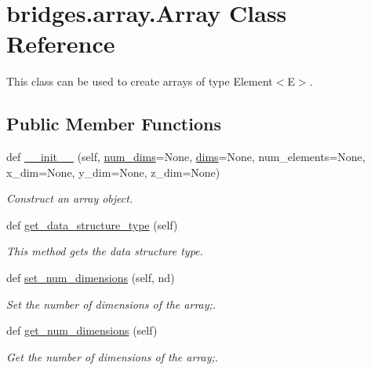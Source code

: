 \hypertarget{classbridges_1_1array_1_1_array}{}\section{bridges.\+array.\+Array Class Reference}
\label{classbridges_1_1array_1_1_array}


This class can be used to create arrays of type Element$<$\+E$>$.  


\subsection*{Public Member Functions}
\begin{DoxyCompactItemize}
\item 
def \mbox{\hyperlink{classbridges_1_1array_1_1_array_a72ca451990833d3a58c7eee6811009ad}{\+\_\+\+\_\+init\+\_\+\+\_\+}} (self, \mbox{\hyperlink{classbridges_1_1array_1_1_array_a2c28c3658312289dc2ae78f4099d4c76}{num\+\_\+dims}}=None, \mbox{\hyperlink{classbridges_1_1array_1_1_array_a69f2c673a6077e203b3e916dd73cd243}{dims}}=None, num\+\_\+elements=None, x\+\_\+dim=None, y\+\_\+dim=None, z\+\_\+dim=None)
\begin{DoxyCompactList}\small\item\em Construct an array object. \end{DoxyCompactList}\item 
def \mbox{\hyperlink{classbridges_1_1array_1_1_array_a27dcb7a04798a215092f42506da679ce}{get\+\_\+data\+\_\+structure\+\_\+type}} (self)
\begin{DoxyCompactList}\small\item\em This method gets the data structure type. \end{DoxyCompactList}\item 
def \mbox{\hyperlink{classbridges_1_1array_1_1_array_adb70532d86e05bf5b9874968a804f23a}{set\+\_\+num\+\_\+dimensions}} (self, nd)
\begin{DoxyCompactList}\small\item\em Set the number of dimensions of the array;. \end{DoxyCompactList}\item 
def \mbox{\hyperlink{classbridges_1_1array_1_1_array_a9a98a7fedc55562af1e571f9256fefe4}{get\+\_\+num\+\_\+dimensions}} (self)
\begin{DoxyCompactList}\small\item\em Get the number of dimensions of the array;. \end{DoxyCompactList}\item 

\end{DoxyCompactItemize}
